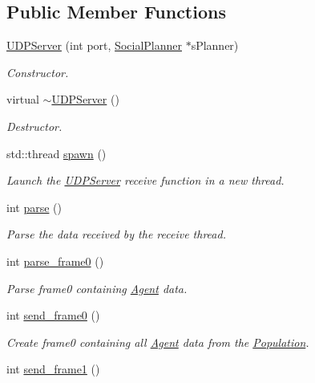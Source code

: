 \subsection*{Public Member Functions}
\begin{DoxyCompactItemize}
\item 
\hyperlink{classUDPServer_a50889d5ad89f209c9894084a34f82e3b}{U\+D\+P\+Server} (int port, \hyperlink{classSocialPlanner}{Social\+Planner} $\ast$s\+Planner)
\begin{DoxyCompactList}\small\item\em Constructor. \end{DoxyCompactList}\item 
virtual \hyperlink{classUDPServer_a09b1a38f1a03d3832f85fe05e6370a11}{$\sim$\+U\+D\+P\+Server} ()
\begin{DoxyCompactList}\small\item\em Destructor. \end{DoxyCompactList}\item 
std\+::thread \hyperlink{classUDPServer_a854b519058c67d57546486bcc9c50de9}{spawn} ()
\begin{DoxyCompactList}\small\item\em Launch the \hyperlink{classUDPServer}{U\+D\+P\+Server} receive function in a new thread. \end{DoxyCompactList}\item 
int \hyperlink{classUDPServer_ae819b033ef968a8231ed1413da3c46d5}{parse} ()
\begin{DoxyCompactList}\small\item\em Parse the data received by the receive thread. \end{DoxyCompactList}\item 
int \hyperlink{classUDPServer_a215a250437888719487938c72ce3225c}{parse\+\_\+frame0} ()
\begin{DoxyCompactList}\small\item\em Parse frame0 containing \hyperlink{classAgent}{Agent} data. \end{DoxyCompactList}\item 
int \hyperlink{classUDPServer_a5303b2aeaec59beafd748d2938b807a2}{send\+\_\+frame0} ()
\begin{DoxyCompactList}\small\item\em Create frame0 containing all \hyperlink{classAgent}{Agent} data from the \hyperlink{classPopulation}{Population}. \end{DoxyCompactList}\item 
int \hyperlink{classUDPServer_adcbe3797150866d0c82e00941555da38}{send\+\_\+frame1} ()

\end{DoxyCompactItemize}
